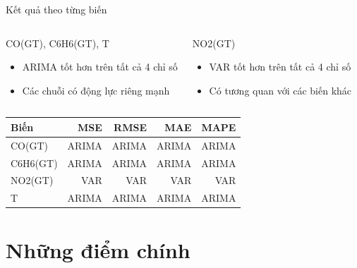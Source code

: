 \documentclass[serif, aspectratio=169]{beamer}
\begin{document}
\begin{frame}{Kết quả theo từng biến}
    \begin{columns}
        \begin{block}{CO(GT), C6H6(GT), T}
            \begin{itemize}
                \item ARIMA tốt hơn trên tất cả 4 chỉ số
                \item Các chuỗi có động lực riêng mạnh
            \end{itemize}
        \end{block}
        
        \begin{alertblock}{NO2(GT)}
            \begin{itemize}
                \item VAR tốt hơn trên tất cả 4 chỉ số
                \item Có tương quan với các biến khác
            \end{itemize}
        \end{alertblock}
    \end{columns}
    
    \vspace{0.4cm}
    \begin{center}
        \begin{tabular}{|l|r|r|r|r|}
            \hline
            \textbf{Biến} & \textbf{MSE} & \textbf{RMSE} & \textbf{MAE} & \textbf{MAPE} \\ \hline
            CO(GT) & ARIMA & ARIMA & ARIMA & ARIMA \\ \hline
            C6H6(GT) & ARIMA & ARIMA & ARIMA & ARIMA \\ \hline
            NO2(GT) & VAR & VAR & VAR & VAR \\ \hline
            T & ARIMA & ARIMA & ARIMA & ARIMA \\ \hline
        \end{tabular}
    \end{center}
\end{frame}

\section{Những điểm chính}
\end{document}
